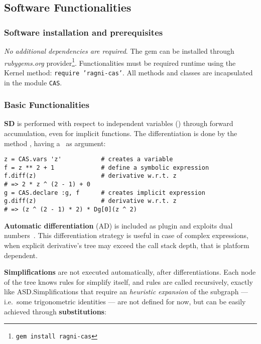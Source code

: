\subsection{Software Functionalities}
\label{sec:functionalities}

\subsubsection{Software installation and prerequisites}

\emph{No additional dependencies are required}. The gem can be installed through \emph{rubygems.org} provider\footnote{\texttt{gem install ragni-cas}}. Functionalities must be required runtime using the Kernel method: \texttt{require 'ragni-cas'}. All methods and classes are incapsulated in the module \texttt{CAS}.

\subsubsection{Basic Functionalities}
\textbf{SD} is performed with respect to independent variables (\CASVariable) through forward accumulation, even for implicit functions. The differentiation is done by the method \CASOpdiff, having a \CASVariable~as argument:

\noindent%
\begin{lstlisting}[caption={Differentiation example},label={code:example-diff}]
z = CAS.vars 'z'           # creates a variable
f = z ** 2 + 1             # define a symbolic expression
f.diff(z)                  # derivative w.r.t. z
# => 2 * z ^ (2 - 1) + 0
g = CAS.declare :g, f      # creates implicit expression
g.diff(z)                  # derivative w.r.t. z
# => (z ^ (2 - 1) * 2) * Dg[0](z ^ 2)
\end{lstlisting}

\textbf{Automatic differentiation} (AD) is included as plugin and exploits dual numbers~\cite{bartholomew2000automatic}. This differentiation strategy is useful in case of complex expressions, when explicit derivative's tree may exceed the call stack depth, that is platform dependent.

\textbf{Simplifications} are not executed automatically, after differentiations. Each node of the tree knows rules for simplify itself, and rules are called recursively, exactly like ASD.\@ Simplifications that require an \emph{heuristic expansion} of the subgraph --- i.e.\ some trigonometric identities --- are not defined for now, but can be easily achieved through \textbf{substitutions}:

